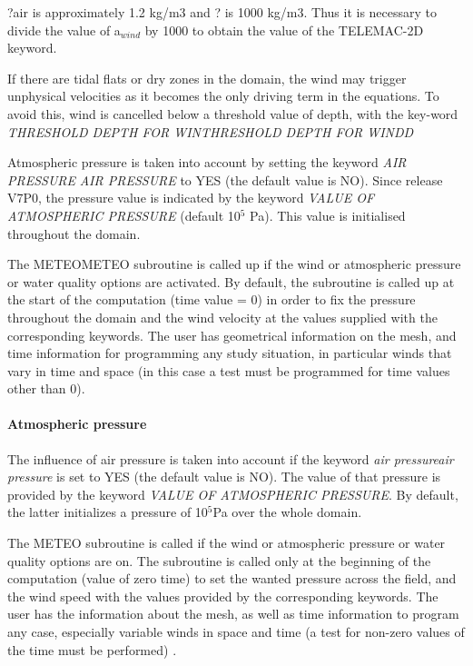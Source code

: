 \documentclass{article} %
\begin{document}
 ?air is approximately 1.2 kg/m3 and ? is 1000 kg/m3. Thus it is necessary to divide the value of a${}_{wind}$ by 1000 to obtain the value of the TELEMAC-2D keyword.

 If there are tidal flats or dry zones in the domain, the wind may trigger unphysical velocities as it becomes the only driving term in the equations. To avoid this, wind is cancelled below a threshold value of depth, with the key-word \textit{THRESHOLD DEPTH FOR WINTHRESHOLD DEPTH FOR WINDD}

 Atmospheric pressure is taken into account by setting the keyword \textit{AIR PRESSURE} \textit{AIR PRESSURE} to YES (the default value is NO). Since release V7P0, the pressure value is indicated by the keyword \textit{VALUE OF ATMOSPHERIC PRESSURE} (default 10${}^{5}$ Pa). This value is initialised throughout the domain.

 The METEOMETEO subroutine is called up if the wind or atmospheric pressure or water quality options are activated. By default, the subroutine is called up at the start of the computation (time value = 0) in order to fix the pressure throughout the domain and the wind velocity at the values supplied with the corresponding keywords. The user has geometrical information on the mesh, and time information for programming any study situation, in particular winds that vary in time and space (in this case a test must be programmed for time values other than 0).


\paragraph{ Atmospheric pressure}

 The influence of air pressure is taken into account if the keyword \textit{air pressureair pressure} is set to YES (the default value is NO). The value of that pressure is provided by the keyword \textit{VALUE OF ATMOSPHERIC PRESSURE}. By default, the latter initializes a pressure of 10${}^{5}$Pa over the whole domain.

 The METEO subroutine is called if the wind or atmospheric pressure or water quality options are on. The subroutine is called only at the beginning of the computation (value of zero time) to set the wanted pressure across the field, and the wind speed with the values {}{}provided by the corresponding keywords. The user has the information about the mesh, as well as time information to program any case, especially variable winds in space and time (a test for non-zero values {}{}of the time must be performed) .
\end{document}
